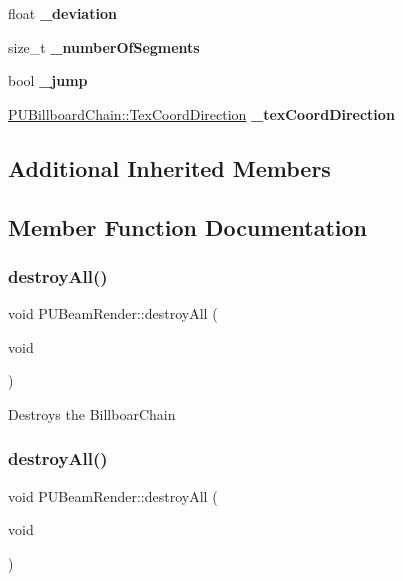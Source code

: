\begin{DoxyCompactItemize}
float {\bfseries \+\_\+deviation}
\item 
\mbox{\label{classPUBeamRender_ac5bca4da45c81aa2ed5e75c15908386c}} 
size\+\_\+t {\bfseries \+\_\+number\+Of\+Segments}
\item 
\mbox{\label{classPUBeamRender_ab41d6314a0851d279231646cd43e0a14}} 
bool {\bfseries \+\_\+jump}
\item 
\mbox{\label{classPUBeamRender_a99247997f4321b06f54f69f19b5eac8a}} 
\hyperlink{classPUBillboardChain_a6ebaec09a615199356b9d50fdab2209f}{P\+U\+Billboard\+Chain\+::\+Tex\+Coord\+Direction} {\bfseries \+\_\+tex\+Coord\+Direction}
\end{DoxyCompactItemize}
\subsection*{Additional Inherited Members}


\subsection{Member Function Documentation}
\mbox{\label{classPUBeamRender_a17f26eb0e5608cfa4b4c9b16e4a5ccb5}} 
\subsubsection{\texorpdfstring{destroy\+All()}{destroyAll()}\hspace{0.1cm}{\footnotesize\ttfamily [1/2]}}
{\footnotesize\ttfamily void P\+U\+Beam\+Render\+::destroy\+All (\begin{DoxyParamCaption}\item[{void}]{ }\end{DoxyParamCaption})}

Destroys the Billboar\+Chain \mbox{\label{classPUBeamRender_a17f26eb0e5608cfa4b4c9b16e4a5ccb5}} 
\subsubsection{\texorpdfstring{destroy\+All()}{destroyAll()}\hspace{0.1cm}{\footnotesize\ttfamily [2/2]}}
{\footnotesize\ttfamily void P\+U\+Beam\+Render\+::destroy\+All (\begin{DoxyParamCaption}\item[{void}]{ }\end{DoxyParamCaption})}

